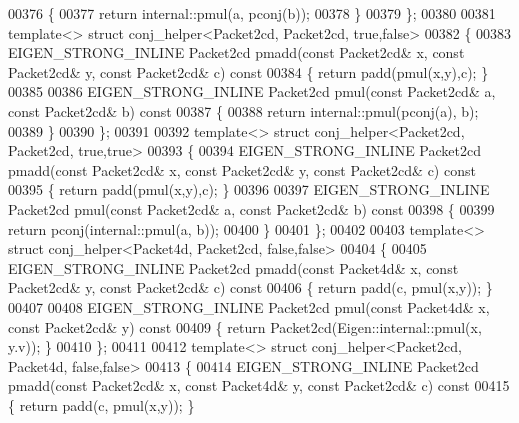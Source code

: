 \begin{DoxyCode}
00376 \textcolor{keyword}{  }\{
00377     \textcolor{keywordflow}{return} internal::pmul(a, pconj(b));
00378   \}
00379 \};
00380 
00381 \textcolor{keyword}{template}<> \textcolor{keyword}{struct }conj\_helper<Packet2cd, Packet2cd, true,false>
00382 \{
00383   EIGEN\_STRONG\_INLINE Packet2cd pmadd(\textcolor{keyword}{const} Packet2cd& x, \textcolor{keyword}{const} Packet2cd& y, \textcolor{keyword}{const} Packet2cd& c)\textcolor{keyword}{ const}
00384 \textcolor{keyword}{  }\{ \textcolor{keywordflow}{return} padd(pmul(x,y),c); \}
00385 
00386   EIGEN\_STRONG\_INLINE Packet2cd pmul(\textcolor{keyword}{const} Packet2cd& a, \textcolor{keyword}{const} Packet2cd& b)\textcolor{keyword}{ const}
00387 \textcolor{keyword}{  }\{
00388     \textcolor{keywordflow}{return} internal::pmul(pconj(a), b);
00389   \}
00390 \};
00391 
00392 \textcolor{keyword}{template}<> \textcolor{keyword}{struct }conj\_helper<Packet2cd, Packet2cd, true,true>
00393 \{
00394   EIGEN\_STRONG\_INLINE Packet2cd pmadd(\textcolor{keyword}{const} Packet2cd& x, \textcolor{keyword}{const} Packet2cd& y, \textcolor{keyword}{const} Packet2cd& c)\textcolor{keyword}{ const}
00395 \textcolor{keyword}{  }\{ \textcolor{keywordflow}{return} padd(pmul(x,y),c); \}
00396 
00397   EIGEN\_STRONG\_INLINE Packet2cd pmul(\textcolor{keyword}{const} Packet2cd& a, \textcolor{keyword}{const} Packet2cd& b)\textcolor{keyword}{ const}
00398 \textcolor{keyword}{  }\{
00399     \textcolor{keywordflow}{return} pconj(internal::pmul(a, b));
00400   \}
00401 \};
00402 
00403 \textcolor{keyword}{template}<> \textcolor{keyword}{struct }conj\_helper<Packet4d, Packet2cd, false,false>
00404 \{
00405   EIGEN\_STRONG\_INLINE Packet2cd pmadd(\textcolor{keyword}{const} Packet4d& x, \textcolor{keyword}{const} Packet2cd& y, \textcolor{keyword}{const} Packet2cd& c)\textcolor{keyword}{ const}
00406 \textcolor{keyword}{  }\{ \textcolor{keywordflow}{return} padd(c, pmul(x,y)); \}
00407 
00408   EIGEN\_STRONG\_INLINE Packet2cd pmul(\textcolor{keyword}{const} Packet4d& x, \textcolor{keyword}{const} Packet2cd& y)\textcolor{keyword}{ const}
00409 \textcolor{keyword}{  }\{ \textcolor{keywordflow}{return} Packet2cd(Eigen::internal::pmul(x, y.v)); \}
00410 \};
00411 
00412 \textcolor{keyword}{template}<> \textcolor{keyword}{struct }conj\_helper<Packet2cd, Packet4d, false,false>
00413 \{
00414   EIGEN\_STRONG\_INLINE Packet2cd pmadd(\textcolor{keyword}{const} Packet2cd& x, \textcolor{keyword}{const} Packet4d& y, \textcolor{keyword}{const} Packet2cd& c)\textcolor{keyword}{ const}
00415 \textcolor{keyword}{  }\{ \textcolor{keywordflow}{return} padd(c, pmul(x,y)); \}

\end{DoxyCode}
